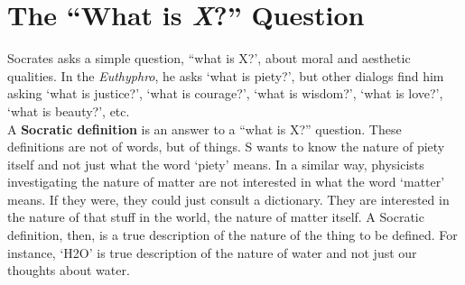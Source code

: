 \documentclass[oneside]{article}
\begin{document}


%

\section*{The ``What is \emph{X}?'' Question}

Socrates asks a simple question, ``what is X?', about moral and aesthetic qualities. In the \emph{Euthyphro}, he asks `what is piety?', but other dialogs find him asking `what is justice?', `what is courage?', `what is wisdom?', `what is love?', `what is beauty?', etc.\\

\noindent A \textbf{Socratic definition} is an answer to a ``what is X?'' question. These definitions are not of words, but of things. S wants to know the nature of piety itself and not just what the word `piety' means. In a similar way, physicists investigating the nature of matter are not interested in what the word `matter' means. If they were, they could just consult a dictionary. They are interested in the nature of that stuff in the world, the nature of matter itself.  A Socratic definition, then, is a true description of the nature of the thing to be defined. For instance, `H2O' is true description of the nature of water and not just our thoughts about water. \\

\end{document}

